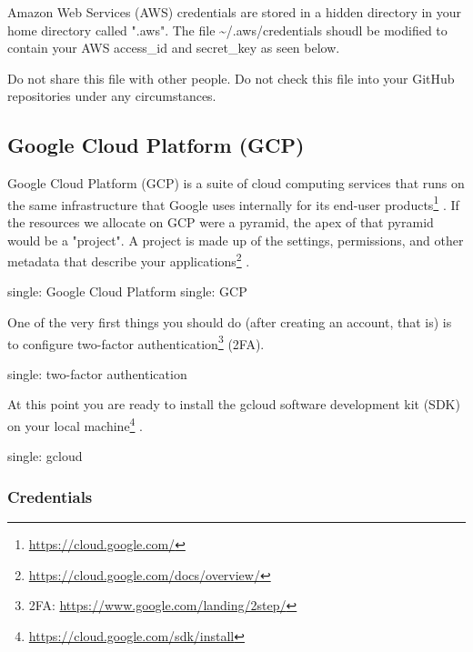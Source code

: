 Amazon Web Services (AWS) credentials are stored in a hidden directory
in your home directory called ".aws". The file
\textasciitilde{}/.aws/credentials shoudl be modified to contain your
AWS access\_id and secret\_key as seen below.

\begin{Shaded}
\begin{Highlighting}[]
\NormalTok{$ }

\NormalTok{[}\NormalTok{]}
\end{Highlighting}
\end{Shaded}

Do not share this file with other people. Do not check this file into
your GitHub repositories under any circumstances.

\hypertarget{google-cloud-platform-gcp}{%
\subsection{Google Cloud Platform
(GCP)}\label{google-cloud-platform-gcp}}

Google Cloud Platform (GCP) is a suite of cloud computing services that
runs on the same infrastructure that Google uses internally for its
end-user products\footnote{\url{https://cloud.google.com/}} . If the
resources we allocate on GCP were a pyramid, the apex of that pyramid
would be a "project". A project is made up of the settings, permissions,
and other metadata that describe your applications\footnote{\url{https://cloud.google.com/docs/overview/}}
.

single: Google Cloud Platform single: GCP

One of the very first things you should do (after creating an account,
that is) is to configure two-factor authentication\footnote{2FA:
  \url{https://www.google.com/landing/2step/}} (2FA).

single: two-factor authentication

At this point you are ready to install the gcloud software development
kit (SDK) on your local machine\footnote{\url{https://cloud.google.com/sdk/install}}
.

single: gcloud

\hypertarget{credentials-1}{%
\subsubsection{Credentials}\label{credentials-1}}

